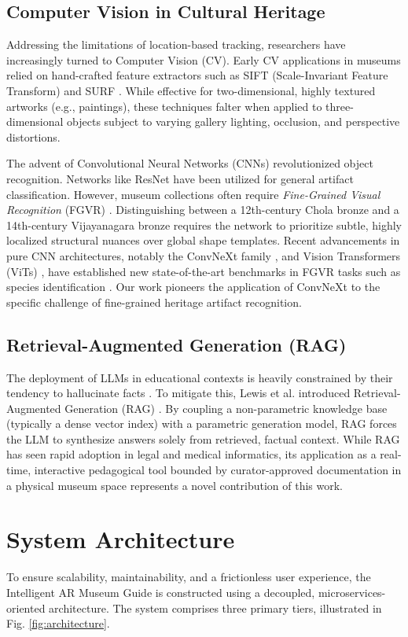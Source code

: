\documentclass[conference]{IEEEtran}
\begin{document}
\subsection{Computer Vision in Cultural Heritage}
Addressing the limitations of location-based tracking, researchers have increasingly turned to Computer Vision (CV). Early CV applications in museums relied on hand-crafted feature extractors such as SIFT (Scale-Invariant Feature Transform) and SURF \cite{sift2004}. While effective for two-dimensional, highly textured artworks (e.g., paintings), these techniques falter when applied to three-dimensional objects subject to varying gallery lighting, occlusion, and perspective distortions.

The advent of Convolutional Neural Networks (CNNs) revolutionized object recognition. Networks like ResNet \cite{resnet} have been utilized for general artifact classification. However, museum collections often require \textit{Fine-Grained Visual Recognition} (FGVR) \cite{fgvr_survey}. Distinguishing between a 12th-century Chola bronze and a 14th-century Vijayanagara bronze requires the network to prioritize subtle, highly localized structural nuances over global shape templates. Recent advancements in pure CNN architectures, notably the ConvNeXt family \cite{convnext}, and Vision Transformers (ViTs) \cite{vit}, have established new state-of-the-art benchmarks in FGVR tasks such as species identification \cite{birds2011}. Our work pioneers the application of ConvNeXt to the specific challenge of fine-grained heritage artifact recognition.

\subsection{Retrieval-Augmented Generation (RAG)}
The deployment of LLMs in educational contexts is heavily constrained by their tendency to hallucinate facts \cite{hallucination2023}. To mitigate this, Lewis et al. introduced Retrieval-Augmented Generation (RAG) \cite{rag2020}. By coupling a non-parametric knowledge base (typically a dense vector index) with a parametric generation model, RAG forces the LLM to synthesize answers solely from retrieved, factual context. While RAG has seen rapid adoption in legal \cite{legalrag} and medical \cite{medicalrag} informatics, its application as a real-time, interactive pedagogical tool bounded by curator-approved documentation in a physical museum space represents a novel contribution of this work.

\section{System Architecture}
To ensure scalability, maintainability, and a frictionless user experience, the Intelligent AR Museum Guide is constructed using a decoupled, microservices-oriented architecture. The system comprises three primary tiers, illustrated in Fig. \ref{fig:architecture}.
\end{document}
